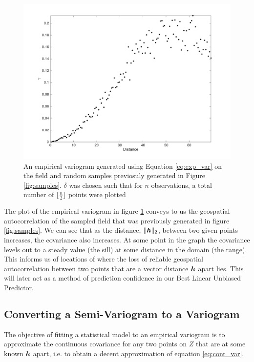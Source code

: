 \documentclass[11pt]{ucthesis}
\newcommand{\vect}[1]{{\it{\boldsymbol{#1}}}}
\begin{document}
\begin{figure}[H]
    \centering    
    \includegraphics[width=\linewidth]{figures/exp_variogram.png}
    \captionsetup{skip=0.5\baselineskip,size=footnotesize}
    \caption{An empirical variogram generated using Equation \ref{eq:exp_var} on the field and random samples previosuly generated in Figure \ref{fig:samples}. $\delta$ was chosen such that for $n$ observations, a total number of $\Big\lfloor \frac{n}{2} \Big\rfloor$ points were plotted}
    \label{fig:exp_var}
\end{figure}

The plot of the empirical variogram in figure \ref{fig:exp_var} conveys to us the geospatial autocorrelation of the sampled field that was previously generated in figure \ref{fig:samples}. We can see that as the distance, $\|\vect{h}\|_2$, between two given points increases, the covariance also increases. At some point in the graph the covariance levels out to a steady value (the sill) at some distance in the domain (the range). This informs us of locations of where the loss of reliable geospatial autocorrelation between two points that are a vector distance $\vect{h}$ apart lies. This will later act as a method of prediction confidence in our Best Linear Unbiased Predictor.

\subsection{Converting a Semi-Variogram to a Variogram}
The objective of fitting a statistical model to an empirical variogram is to approximate the continuous covariance for any two points on $Z$ that are at some known $\vect{h}$ apart, i.e. to obtain a decent approximation of equation \ref{eq:cont_var}.
\end{document}
